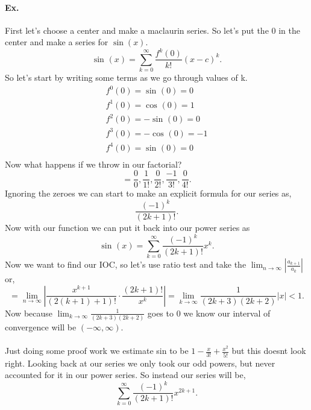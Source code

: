 \paragraph{Ex.}
	First let's choose a center and make a maclaurin series. So let's put the 0 in the center and make a series for $ \sin\left( x \right)  $.
	\[
	\sin^{  } \left( x \right) = \sum_{ k=0 } ^{ \infty } \frac{ f^{ k }\left( 0 \right)  }{ k! }\left( x-c \right) ^{ k }
	.\] 
	So let's start by writing some terms as we go through values of k. 
	\begin{gather*}
	f^{ 0 }\left( 0 \right) =\sin^{  } \left( 0 \right) =0 \\
	f^{ 1 }\left( 0 \right) =\cos^{  } \left( 0 \right) =1 \\
	f^{ 2 }\left( 0 \right) =-\sin^{  } \left( 0 \right) =0 \\
	f^{ 3 }\left( 0 \right) =-\cos^{  } \left( 0 \right) =-1 \\
	f^{ 4 }\left( 0 \right) =\sin^{  } \left( 0 \right) =0 \\
	\end{gather*}
	Now what happens if we throw in our factorial?
	\[
	=\frac{ 0 }{ 0 } , \frac{ 1 }{ 1! }, \frac{ 0 }{ 2! }, \frac{ -1 }{ 3! }, \frac{ 0 }{ 4! }
	.\] 
	Ignoring the zeroes we can start to make an explicit formula for our series as,
	\[
	\frac{ \left( -1 \right) ^{ k } }{ \left( 2k+1 \right) ! }
	.\] 
	Now with our function we can put it back into our power series as
	\[
	\sin^{  } \left( x \right) =\sum_{ k=0 } ^{ \infty } \frac{ \left( -1 \right) ^{ k } }{ \left( 2k+1 \right) ! }x^{ k }
	.\] 
	Now we want to find our IOC, so let's use ratio test and take the $ \lim_{ n \to \infty} \left| \frac{ a_{ k+1 } }{ a_k } \right| $ or,
	\[
	=\lim_{ n \to \infty} \left| \frac{ x^{ k+1 } }{ \left( 2\left( k+1 \right) +1 \right) ! }\cdot \frac{ \left( 2k+1 \right) ! }{ x^{ k } } \right| = \lim_{ k \to \infty} \frac{ 1 }{ \left( 2k+3 \right) \left( 2k+2 \right)  } \left| x \right|<1
	.\] 
	Now because $ \lim_{ k \to \infty} \frac{ 1 }{ \left( 2k+3 \right) \left( 2k+2 \right)  }  $ goes to 0 we know our interval of convergence will be $ \left( -\infty,\infty \right)  $.  \\ \\ 
	Just doing some proof work we estimate sin to be $ 1-\frac{ x }{ 3! } +\frac{ x^2 }{ 5! }  $ but this doesnt look right. Looking back at our series we only took our odd powers, but never accounted for it in our power series. So instead our series will be,
	\[
	\sum_{ k=0 } ^{ \infty } \frac{ \left( -1 \right) ^{ k } }{ \left( 2k+1 \right) ! }x^{ 2k+1 }
	.\] 


